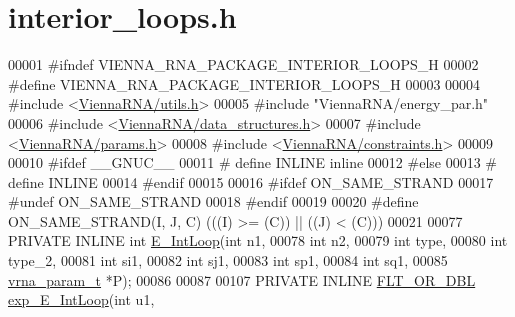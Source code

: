 \hypertarget{interior__loops_8h_source}{}\section{interior\+\_\+loops.\+h}
\label{interior__loops_8h_source}

\begin{DoxyCode}
00001 \textcolor{preprocessor}{#ifndef VIENNA\_RNA\_PACKAGE\_INTERIOR\_LOOPS\_H}
00002 \textcolor{preprocessor}{#define VIENNA\_RNA\_PACKAGE\_INTERIOR\_LOOPS\_H}
00003 
00004 \textcolor{preprocessor}{#include <\hyperlink{utils_8h}{ViennaRNA/utils.h}>}
00005 \textcolor{preprocessor}{#include "ViennaRNA/energy\_par.h"}
00006 \textcolor{preprocessor}{#include <\hyperlink{data__structures_8h}{ViennaRNA/data\_structures.h}>}
00007 \textcolor{preprocessor}{#include <\hyperlink{params_8h}{ViennaRNA/params.h}>}
00008 \textcolor{preprocessor}{#include <\hyperlink{constraints_8h}{ViennaRNA/constraints.h}>}
00009 
00010 \textcolor{preprocessor}{#ifdef \_\_GNUC\_\_}
00011 \textcolor{preprocessor}{# define INLINE inline}
00012 \textcolor{preprocessor}{#else}
00013 \textcolor{preprocessor}{# define INLINE}
00014 \textcolor{preprocessor}{#endif}
00015 
00016 \textcolor{preprocessor}{#ifdef ON\_SAME\_STRAND}
00017 \textcolor{preprocessor}{#undef ON\_SAME\_STRAND}
00018 \textcolor{preprocessor}{#endif}
00019 
00020 \textcolor{preprocessor}{#define ON\_SAME\_STRAND(I, J, C)  (((I) >= (C)) || ((J) < (C)))}
00021 
00077 PRIVATE INLINE \textcolor{keywordtype}{int} \hyperlink{group__loops_gaafbc187b7f78e8e82afb77dd6f3b8fc5}{E\_IntLoop}(\textcolor{keywordtype}{int}          n1,
00078                              \textcolor{keywordtype}{int}          n2,
00079                              \textcolor{keywordtype}{int}          type,
00080                              \textcolor{keywordtype}{int}          type\_2,
00081                              \textcolor{keywordtype}{int}          si1,
00082                              \textcolor{keywordtype}{int}          sj1,
00083                              \textcolor{keywordtype}{int}          sp1,
00084                              \textcolor{keywordtype}{int}          sq1,
00085                              \hyperlink{group__energy__parameters_structvrna__param__s}{vrna\_param\_t} *P);
00086 
00087 
00107 PRIVATE INLINE \hyperlink{group__data__structures_ga31125aeace516926bf7f251f759b6126}{FLT\_OR\_DBL} \hyperlink{group__loops_ga95de54d8a2a17645a95e0f34e189d9c9}{exp\_E\_IntLoop}(\textcolor{keywordtype}{int}               u1,

\end{DoxyCode}
